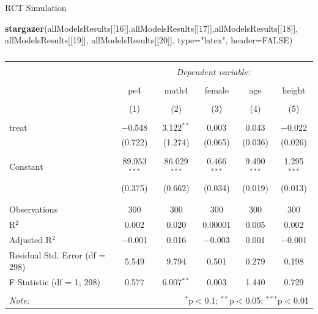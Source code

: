 \documentclass[
  ignorenonframetext,
]{beamer}
\newenvironment{Shaded}{\begin{snugshade}}{\end{snugshade}}
\newcommand{\DataTypeTok}[1]{\textcolor[rgb]{0.13,0.29,0.53}{#1}}
\newcommand{\DecValTok}[1]{\textcolor[rgb]{0.00,0.00,0.81}{#1}}
\newcommand{\KeywordTok}[1]{\textcolor[rgb]{0.13,0.29,0.53}{\textbf{#1}}}
\newcommand{\NormalTok}[1]{#1}
\newcommand{\OtherTok}[1]{\textcolor[rgb]{0.56,0.35,0.01}{#1}}
\newcommand{\StringTok}[1]{\textcolor[rgb]{0.31,0.60,0.02}{#1}}
\begin{document}
\begin{frame}[fragile]{RCT Simulation}
\protect\hypertarget{rct-simulation-10}{}
\tiny

\begin{Shaded}
\begin{Highlighting}[]
\KeywordTok{stargazer}\NormalTok{(allModelsResults[[}\DecValTok{16}\NormalTok{]],allModelsResults[[}\DecValTok{17}\NormalTok{]],allModelsResults[[}\DecValTok{18}\NormalTok{]],}
\NormalTok{          allModelsResults[[}\DecValTok{19}\NormalTok{]], allModelsResults[[}\DecValTok{20}\NormalTok{]], }\DataTypeTok{type=}\StringTok{"latex"}\NormalTok{, }\DataTypeTok{header=}\OtherTok{FALSE}\NormalTok{)}
\end{Highlighting}
\end{Shaded}

\begin{table}[!htbp] \centering 
  \caption{} 
  \label{} 
\begin{tabular}{@{\extracolsep{5pt}}lccccc} 
\\[-1.8ex]\hline 
\hline \\[-1.8ex] 
 & \multicolumn{5}{c}{\textit{Dependent variable:}} \\ 
\cline{2-6} 
\\[-1.8ex] & pe4 & math4 & female & age & height \\ 
\\[-1.8ex] & (1) & (2) & (3) & (4) & (5)\\ 
\hline \\[-1.8ex] 
 treat & $-$0.548 & 3.122$^{**}$ & 0.003 & 0.043 & $-$0.022 \\ 
  & (0.722) & (1.274) & (0.065) & (0.036) & (0.026) \\ 
  & & & & & \\ 
 Constant & 89.953$^{***}$ & 86.029$^{***}$ & 0.466$^{***}$ & 9.490$^{***}$ & 1.295$^{***}$ \\ 
  & (0.375) & (0.662) & (0.034) & (0.019) & (0.013) \\ 
  & & & & & \\ 
\hline \\[-1.8ex] 
Observations & 300 & 300 & 300 & 300 & 300 \\ 
R$^{2}$ & 0.002 & 0.020 & 0.00001 & 0.005 & 0.002 \\ 
Adjusted R$^{2}$ & $-$0.001 & 0.016 & $-$0.003 & 0.001 & $-$0.001 \\ 
Residual Std. Error (df = 298) & 5.549 & 9.794 & 0.501 & 0.279 & 0.198 \\ 
F Statistic (df = 1; 298) & 0.577 & 6.007$^{**}$ & 0.003 & 1.440 & 0.729 \\ 
\hline 
\hline \\[-1.8ex] 
\textit{Note:}  & \multicolumn{5}{r}{$^{*}$p$<$0.1; $^{**}$p$<$0.05; $^{***}$p$<$0.01} \\ 
\end{tabular} 
\end{table}
\end{frame}
\end{document}
